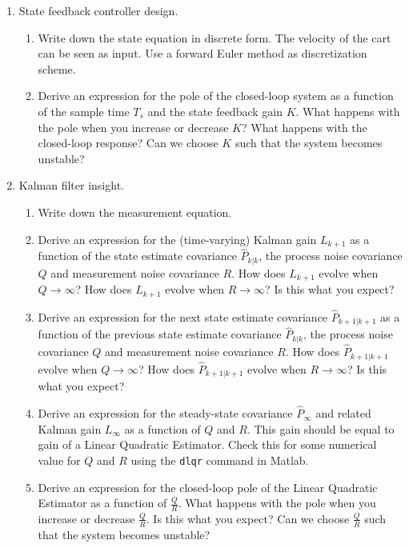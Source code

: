 \documentclass[10pt,a4paper]{article}
\begin{document}
\begin{enumerate}
  \item State feedback controller design.
  \begin{enumerate}
    \item Write down the state equation in discrete form. The velocity of the cart can be seen as input. Use a forward Euler method as discretization scheme.
    \item Derive an expression for the pole of the closed-loop system as a function of the sample time $T_s$ and the state feedback gain $K$. What happens with the pole when you increase or decrease $K$? What happens with the closed-loop response? Can we choose $K$ such that the system becomes unstable?
  \end{enumerate}

  \item Kalman filter insight.
  \begin{enumerate}
    \item Write down the measurement equation.
    \item Derive an expression for the (time-varying) Kalman gain $L_{k+1}$ as a function of the state estimate covariance $\hat{P}_{k|k}$, the process noise covariance $Q$ and measurement noise covariance $R$. How does $L_{k+1}$ evolve when $Q\rightarrow\infty$? How does $L_{k+1}$ evolve when $R\rightarrow\infty$? Is this what you expect?
    \item Derive an expression for the next state estimate covariance $\hat{P}_{k+1|k+1}$ as a function of the previous state estimate covariance $\hat{P}_{k|k}$, the process noise covariance $Q$ and measurement noise covariance $R$. How does $\hat{P}_{k+1|k+1}$ evolve when $Q\rightarrow\infty$? How does $\hat{P}_{k+1|k+1}$ evolve when $R\rightarrow\infty$? Is this what you expect?
    \item Derive an expression for the steady-state covariance $\hat{P}_\infty$ and related Kalman gain $L_\infty$ as a function of $Q$ and $R$. This gain should be equal to gain of a Linear Quadratic Estimator. Check this for some numerical value for $Q$ and $R$ using the \texttt{dlqr} command in Matlab.
    \item Derive an expression for the closed-loop pole of the Linear Quadratic Estimator as a function of $\frac{Q}{R}$. What happens with the pole when you increase or decrease $\frac{Q}{R}$. Is this what you expect? Can we choose $\frac{Q}{R}$ such that the system becomes unstable?
  \end{enumerate}
\newpage

\end{enumerate}
\end{document}
